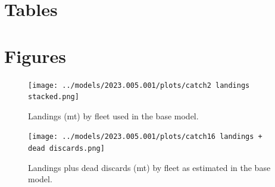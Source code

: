 \documentclass[11pt,
  english,
  letterpaper,
]{article}
\begin{document}
\clearpage

\hypertarget{tables}{%
\section{Tables}\label{tables}}

\clearpage

\hypertarget{figures}{%
\section{Figures}\label{figures}}

\begin{figure}
\centering
\texttt{[image: ../models/2023.005.001/plots/catch2 landings stacked.png]}
\caption{Landings (mt) by fleet used in the base model.\label{fig:catch-figures-r4ss}}
\end{figure}

\begin{figure}
\centering
\texttt{[image: ../models/2023.005.001/plots/catch16 landings + dead discards.png]}
\caption{Landings plus dead discards (mt) by fleet as estimated in the base model.\label{fig:catchdiscard-figures-r4ss}}
\end{figure}
\end{document}
